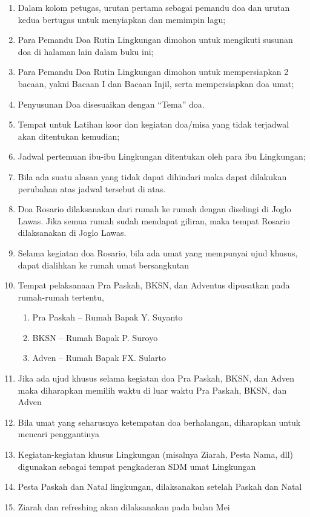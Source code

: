 \begin{enumerate}
\item Dalam kolom petugas,  urutan pertama sebagai pemandu doa dan urutan
kedua bertugas untuk menyiapkan dan memimpin lagu;
\item Para Pemandu Doa Rutin Lingkungan dimohon untuk mengikuti susunan
doa di halaman lain dalam buku ini;
\item Para Pemandu Doa Rutin Lingkungan dimohon untuk mempersiapkan 2
bacaan,  yakni Bacaan I dan Bacaan Injil,  serta mempersiapkan doa umat;
\item Penyusunan Doa disesuaikan dengan
{\textquotedblleft}Tema{\textquotedblright} doa. 
\item Tempat untuk Latihan koor dan kegiatan doa/misa yang tidak
terjadwal akan ditentukan kemudian;
\item Jadwal pertemuan ibu-ibu Lingkungan ditentukan oleh para ibu
Lingkungan;
\item Bila ada suatu alasan yang tidak dapat dihindari maka dapat
dilakukan perubahan atas jadwal tersebut di atas. 
\item Doa Rosario dilaksanakan dari rumah ke rumah dengan diselingi di Joglo Lawas. Jika semua rumah sudah mendapat giliran,  maka tempat Rosario dilaksanakan di Joglo Lawas.
\item Selama kegiatan doa Rosario,  bila ada umat yang mempunyai ujud khusus,  dapat dialihkan ke rumah umat bersangkutan
\item Tempat pelaksanaan Pra Paskah,  BKSN,  dan Adventus dipusatkan pada rumah-rumah tertentu, 
\begin{enumerate}
\item Pra Paskah -- Rumah Bapak Y. Suyanto
\item BKSN -- Rumah Bapak P. Suroyo
\item Adven -- Rumah Bapak FX. Sularto
\end{enumerate}

\item Jika ada ujud khusus selama kegiatan doa Pra Paskah,  BKSN,  dan Adven maka diharapkan memilih waktu di luar waktu Pra Paskah,  BKSN,  dan Adven
\item Bila umat yang seharusnya ketempatan doa berhalangan,  diharapkan untuk
mencari penggantinya
\item Kegiatan-kegiatan khusus Lingkungan (misalnya Ziarah,  Pesta Nama,  dll) digunakan sebagai tempat pengkaderan SDM umat Lingkungan 
\item Pesta Paskah dan Natal lingkungan,  dilaksanakan setelah Paskah dan Natal
\item Ziarah dan refreshing akan dilaksanakan pada bulan Mei
\end{enumerate}
